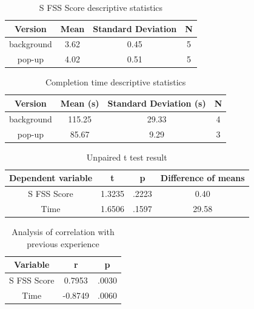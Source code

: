 \documentclass{acmsiggraph}
\begin{document}
\begin{table}[ht]
  \centering
  \caption{S FSS Score descriptive statistics}
  \label{SFSS descriptive}
  \begin{tabular}{|c|c|c|c|}
  	\hline
  	\textbf{Version} & \textbf{Mean} & \textbf{Standard Deviation} & \textbf{N}\\
    \hline
    background & 3.62 & 0.45 & 5 \\
	pop-up & 4.02 & 0.51 & 5 \\
    \hline
  \end{tabular}
\end{table}

\begin{table}[ht]
  \centering
  \caption{Completion time descriptive statistics}
  \label{time}
  \begin{tabular}{|c|c|c|c|}
  	\hline
  	\textbf{Version} & \textbf{Mean (s)} & \textbf{Standard Deviation (s)} & \textbf{N}\\
    \hline
    background & 115.25 & 29.33 & 4 \\
	pop-up & 85.67 & 9.29 & 3 \\
    \hline
  \end{tabular}
\end{table}

\begin{table}[ht]
  \centering
  \caption{Unpaired t test result}
  \label{ttest}
  \begin{tabular}{|c|c|c|c|}
  	\hline
  	\textbf{Dependent variable} &\textbf{t}  &\textbf{p} & \textbf{Difference of means}\\
    \hline
    S FSS Score & 1.3235 & .2223 & 0.40 \\
    Time & 1.6506 & .1597 & 29.58\\
    \hline
  \end{tabular}
\end{table}

\begin{table}[ht]
  \centering
  \caption{Analysis of correlation with previous experience}
  \label{corr}
  \begin{tabular}{|c|c|c|}
  	\hline
  	\textbf{Variable} &\textbf{r} & \textbf{p}\\
    \hline
    S FSS Score & 0.7953 & .0030 \\
    Time & -0.8749 & .0060\\
    \hline
  \end{tabular}
\end{table}
\end{document}
